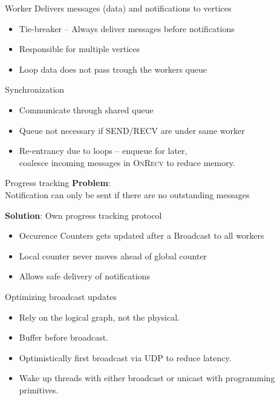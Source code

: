 \begin{frame}[t]{Worker}
  \vspace{0.15cm}
  Delivers messages (data) and notifications to vertices

  \begin{itemize}\setlength\itemsep{0.25cm}
    \item Tie-breaker -- Always deliver messages before notifications
    \item Responsible for multiple vertices
    \item Loop data does not pass trough the workers queue
  \end{itemize}

  \pause
  \vspace{0.25cm}
  Synchronization
  \begin{itemize}\setlength\itemsep{0.25cm}
    \item Communicate through shared queue
    \item Queue not necessary if \textsc{SEND/RECV} are under same worker
    \item Re-entrancy due to loops -- enqueue for later, \\
          coalesce incoming messages in \textsc{OnRecv} to reduce memory.
  \end{itemize}

\end{frame}

\begin{frame}[t]{Progress tracking}
\vspace{0.15cm}
\textbf{Problem}: \\
\vspace{0.15cm}
Notification can only be sent if there are no outstanding messages

  \vspace{0.5cm}
  \textbf{Solution}: Own progress tracking protocol
  \begin{itemize}\setlength\itemsep{0.25cm}
     \item Occurence Counters gets updated after a Broadcast to all workers
     \item Local counter never moves ahead of global counter
    \item Allows safe delivery of notifications
   \end{itemize}

\end{frame}

\begin{frame}[t]{Optimizing broadcast updates}
  \vspace{0.15cm}
   \begin{itemize}\setlength\itemsep{0.25cm}
     \item Rely on the logical graph, not the physical.
     \item Buffer before broadcast.
     \item Optimistically first broadcast via UDP to reduce latency.
     \item Wake up threads with either broadcast or unicast with programming primitives.
   \end{itemize}

\end{frame}

